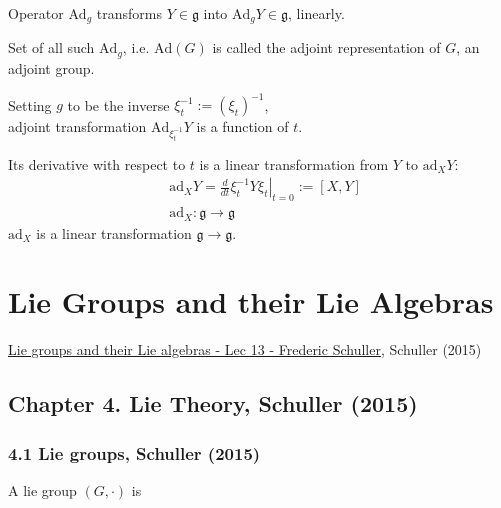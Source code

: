 Operator $\text{Ad}_g$ transforms $Y \in \mathfrak{g}$ into $\text{Ad}_g Y \in \mathfrak{g}$, linearly. 

Set of all such $\text{Ad}_g$, i.e. $\text{Ad}(G)$ is called the adjoint representation of $G$, an adjoint group. 

Setting $g$ to be the inverse $\xi^{-1}_t := (\xi_t)^{-1}$, \\
adjoint transformation $\text{Ad}_{\xi^{-1}_t} Y$ is a function of $t$.

Its derivative with respect to $t$ is a linear transformation from $Y$ to $\text{ad}_X Y$:
\begin{equation}
\begin{aligned}
	& \text{ad}_X Y = \left. \frac{d}{dt} \xi_t^{-1} Y \xi_t \right|_{t=0} := [X, Y] \\
	& \text{ad}_X : \mathfrak{g} \to \mathfrak{g}
\end{aligned}
\end{equation}
$\text{ad}_X $ is a linear transformation $\mathfrak{g} \to \mathfrak{g}$.





\section{Lie Groups and their Lie Algebras}

\href{https://youtu.be/mJ8ZDdA10GY}{Lie groups and their Lie algebras - Lec 13 - Frederic Schuller}, Schuller (2015) \cite{dgdt:Schu2015}

\subsection{Chapter 4. Lie Theory, Schuller (2015) \cite{dgdt:Schu2015}}

\subsubsection{4.1 Lie groups, Schuller (2015) \cite{dgdt:Schu2015}}

\begin{definition} A lie group $(G, \cdot )$ is 
\end{definition}

